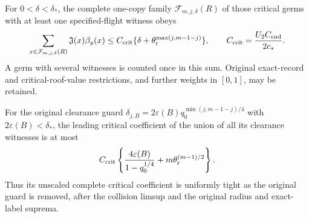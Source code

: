 \begin{theorem}
\label{thm:ce-critical}
For $0<\delta<\delta_*$, the complete one-copy family
$\mathcal F_{m,j,\delta}(R)$ of those critical germs with
at least one specified-flight witness obeys
\begin{equation}\label{eq:ce-critical}
 \sum_{x\in\mathcal F_{m,j,\delta}(R)}
          \mathfrak J(x)\beta_y(x)
 \le C_{\rm crit}
       \{\delta+\theta_{\rm r}^{\max(j,m-1-j)}\},
 \qquad C_{\rm crit}=\frac{U_2C_{\rm end}}{2c_*}.
\end{equation}
A germ with several witnesses is counted once in this sum.
Original exact-record and critical-roof-value restrictions,
and further weights in $[0,1]$, may be retained.

For the original clearance guard
$\delta_{j,B}=2\varepsilon(B)q_0^{\min(j,m-1-j)/4}$
with $2\varepsilon(B)<\delta_*$, the leading critical
coefficient of the union of all its clearance witnesses is
at most
\begin{equation}\label{eq:ce-guard-critical}
 C_{\rm crit}\left\{
   \frac{4\varepsilon(B)}{1-q_0^{1/4}}
                 +m\theta_{\rm r}^{(m-1)/2}\right\}.
\end{equation}
Thus its unscaled complete critical coefficient is uniformly
tight as the original guard is removed, after the collision
limsup and the original radius and exact-label suprema.
\end{theorem}
